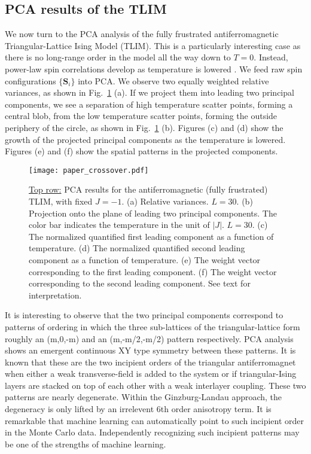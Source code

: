 \documentclass[pra,letterpaper,10pt,twocolumn]{revtex4}
\begin{document}
\subsection{PCA results of the TLIM }

We now turn to the PCA analysis of the fully frustrated
antiferromagnetic Triangular-Lattice Ising Model (TLIM).  This is a
particularly interesting case as there is no long-range order in the
model all the way down to $T=0$. Instead, power-law spin correlations
develop as temperature is lowered \cite{Stephenson1, Stephenson2}.  We
feed raw spin configurations $\{\mathbf{S}_i\}$ into PCA. We observe two
equally weighted relative variances, as shown in
Fig.~\ref{fig:crossover_models} (a).  If we project them into leading
two principal components, we see a separation of high temperature
scatter points, forming a central blob, from the low temperature scatter
points, forming the outside periphery of the circle, as shown in
Fig.~\ref{fig:crossover_models} (b). Figures (c) and (d) show the growth
of the projected principal components as the temperature is lowered.
Figures (e) and (f) show the spatial patterns in the projected
components.

\begin{figure}[!h]
\texttt{[image: paper\_crossover.pdf]}  
\caption{
\underline{Top row:} PCA results for the antiferromagnetic (fully
frustrated) TLIM, with fixed $J=-1$. (a) Relative variances. $L=30$. (b)
Projection onto the plane of leading two principal components. The color
bar indicates the temperature in the unit of $|J|$. $L=30$. (c) The
normalized quantified first leading component as a function of
temperature. (d) The normalized quantified second leading component as a
function of temperature. (e) The weight vector corresponding to the
first leading component.  (f) The weight vector corresponding to the
second leading component.  See text for interpretation.
\label{fig:crossover_models}
}
\end{figure}


It is interesting to observe that the two principal components
correspond to patterns of ordering in which the three sub-lattices of
the triangular-lattice form roughly an (m,0,-m) and an (m,-m/2,-m/2)
pattern respectively.  PCA analysis shows an emergent continuous XY type
symmetry between these patterns. It is known \cite{moessner,grest} that
these are the two incipient orders of the triangular antiferromagnet
when either a weak transverse-field is added to the system or if
triangular-Ising layers are stacked on top of each other with a weak
interlayer coupling. These two patterns are nearly degenerate. Within
the Ginzburg-Landau approach, the degeneracy is only lifted by an
irrelevent 6th order anisotropy term. It is remarkable that machine
learning can automatically point to such incipient order in the Monte
Carlo data. Independently recognizing such incipient patterns may be one
of the strengths of machine learning.
\end{document}
